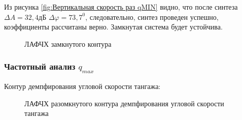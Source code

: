 Из рисунка \ref{fig:Вертикальная скорость раз qMIN} видно, что после синтеза $\Delta A = 32,4 $дБ $\Delta \varphi = 73,7^0$, следовательно, синтез проведен успешно, коэффициенты рассчитаны верно. Замкнутая система будет устойчива. 

\begin{figure}[H]
    \caption{ЛАФЧХ замкнутого контура }
    \label{fig:Вертикальная скорость зам qMIN}
\end{figure}
\subsubsection{Частотный анализ $q_{max}$}

\begin{center}
    Контур демпфирования угловой скорости тангажа:
\end{center}

\begin{figure}[H]
    \caption{ЛАФЧХ разомкнутого контура демпфирования угловой скорости тангажа}
    \label{fig:Угловая скорость тангажа раз qMAX}
\end{figure}

